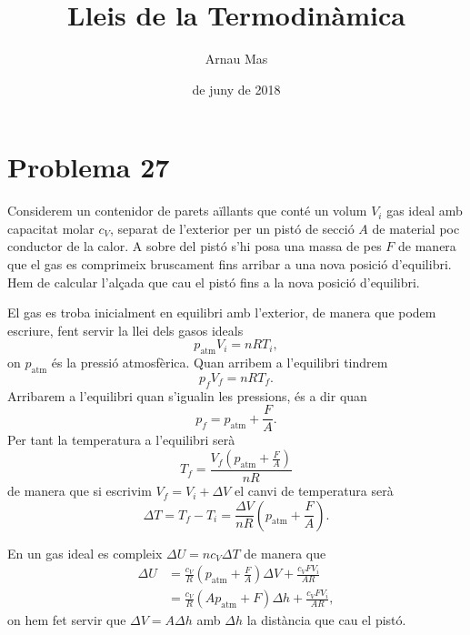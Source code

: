 \documentclass[12pt]{article}
\title{\sffamily {\bfseries Entrega 4:} Lleis de la Termodinàmica}
\author{\sffamily Arnau Mas}
\date{\sffamily 15 de juny de 2018}
\begin{document}
\maketitle
\section{Problema 27}
Considerem un contenidor de parets aïllants que conté un volum \( V_i \) gas ideal amb capacitat molar \( c_V \), separat de l'exterior per un pistó de secció \( A \) de material poc conductor de la calor. A sobre del pistó s'hi posa una massa de pes \( F \) de manera que el gas es comprimeix bruscament fins arribar a una nova posició d'equilibri. Hem de calcular l'alçada que cau el pistó fins a la nova posició d'equilibri.  

El gas es troba inicialment en equilibri amb l'exterior, de manera que podem escriure, fent servir la llei dels gasos ideals
\begin{equation*}
	p_{\text{atm}}V_i = nRT_i,
\end{equation*}
on \( p_{\text{atm}} \) és la pressió atmosfèrica. Quan arribem a l'equilibri tindrem
\begin{equation*}
	p_f V_f = nRT_f.
\end{equation*}
Arribarem a l'equilibri quan s'igualin les pressions, és a dir quan
\begin{equation*}
	p_f = p_{\text{atm}} + \frac{F}{A}.
\end{equation*}
Per tant la temperatura a l'equilibri serà
\begin{equation*}
	T_f = \frac{V_f \left(p_{\text{atm}} + \frac{F}{A}\right)}{nR} 
\end{equation*}
de manera que si escrivim \( V_f = V_i + \Delta V \) el canvi de temperatura serà
\begin{equation*}
	\Delta T = T_f - T_i = \frac{\Delta V}{nR}\left(p_{\text{atm}} + \frac{F}{A}\right).
\end{equation*}

En un gas ideal es compleix \( \Delta U = nc_V \Delta T \) de manera que
\begin{align*}
	\Delta U & = \frac{c_V}{R} \left(p_{\text{atm}} + \frac{F}{A}\right) \Delta V + \frac{c_V F V_i}{AR} \\
					 & = \frac{c_V}{R} (A p_{\text{atm}} + F) \Delta h + \frac{c_V F V_i}{AR},
\end{align*}
on hem fet servir que \( \Delta V = A\Delta h \) amb \( \Delta h \) la distància que cau el pistó. 
\end{document}
